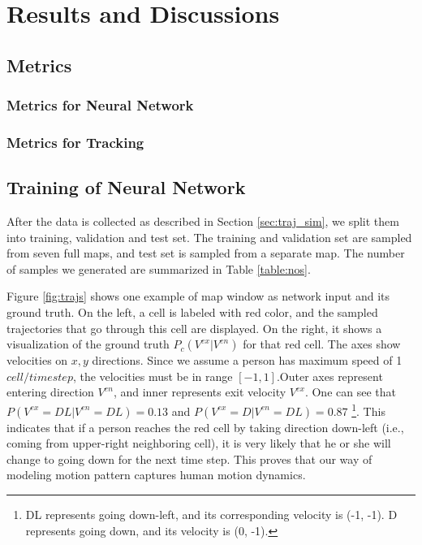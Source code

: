 \chapter{Results and Discussions} \label{chapter:5}


\section{Metrics}

\subsection{Metrics for Neural Network}

\subsection{Metrics for Tracking}

\section{Training of Neural Network}

After the data is collected as described in Section \ref{sec:traj_sim}, we split them into training, validation and test set. The training and validation set are sampled from seven full maps, and test set is sampled from a separate map. The number of samples we generated are summarized in Table \ref{table:nos}. 

Figure \ref{fig:trajs} shows one example of map window as network input and its ground truth. On the left, a cell is labeled with red color, and the sampled trajectories that go through this cell are displayed. On the right, it shows a visualization of the ground truth \( P_c(V^{ex} | V^{en}) \) for that red cell. The axes show velocities on \( x, y\) directions. Since we assume a person has maximum speed of 1 $cell/timestep$, the velocities must be in range $[-1,1]. $Outer axes represent entering direction \( V^{en} \), and inner represents exit velocity \( V^{ex} \). One can see that \( P(V^{ex}=DL | V^{en}=DL) = 0.13 \) and \( P(V^{ex}=D | V^{en}=DL) = 0.87 \) \footnote{DL represents going down-left, and its corresponding velocity is (-1, -1). D represents going down, and its velocity is (0, -1).}. This indicates that if a person reaches the red cell by taking direction down-left (i.e., coming from upper-right neighboring cell), it is very likely that he or she will change to going down for the next time step. This proves that our way of modeling motion pattern captures human motion dynamics.

